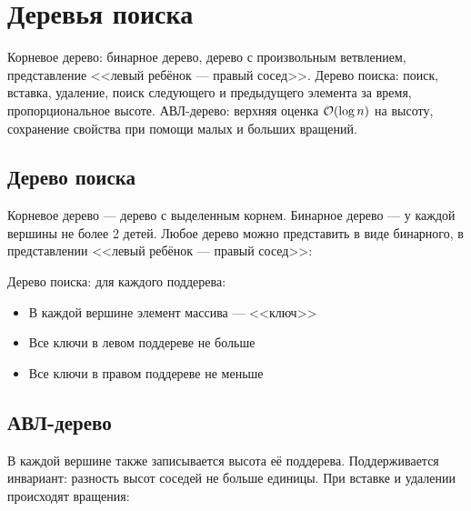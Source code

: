 \section{Деревья поиска}
Корневое дерево:
бинарное дерево,
дерево с произвольным ветвлением,
представление <<левый ребёнок --- правый сосед>>.
Дерево поиска: поиск, вставка, удаление,
поиск следующего и предыдущего элемента за время,
пропорциональное высоте.
АВЛ-дерево: верхняя оценка $\mathcal{O}(\log n)$ на высоту,
сохранение свойства при помощи малых и больших вращений.

\subsection{Дерево поиска}
Корневое дерево --- дерево с выделенным корнем.
Бинарное дерево --- у каждой вершины не более 2 детей.
Любое дерево можно представить в виде бинарного,
в представлении <<левый ребёнок --- правый сосед>>:

\begin{center}
\end{center}

Дерево поиска: для каждого поддерева:
\begin{itemize}
    \item В каждой вершине элемент массива --- <<ключ>>
    \item Все ключи в левом поддереве не больше
    \item Все ключи в правом поддереве не меньше
\end{itemize}

\subsection{АВЛ-дерево}
В каждой вершине также записывается высота её поддерева.
Поддерживается инвариант: разность высот соседей не больше единицы.
При вставке и удалении происходят вращения:

